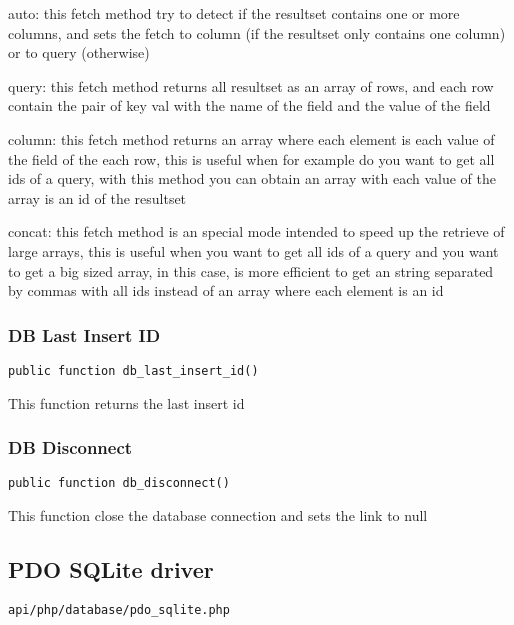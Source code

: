 \documentclass[a4paper]{article}
\begin{document}
auto: this fetch method try to detect if the resultset contains one or more columns, and
sets the fetch to column (if the resultset only contains one column) or to query (otherwise)

query: this fetch method returns all resultset as an array of rows, and each row contain the
pair of key val with the name of the field and the value of the field

column: this fetch method returns an array where each element is each value of the field of
the each row, this is useful when for example do you want to get all ids of a query, with
this method you can obtain an array with each value of the array is an id of the resultset

concat: this fetch method is an special mode intended to speed up the retrieve of large
arrays, this is useful when you want to get all ids of a query and you want to get a big
sized array, in this case, is more efficient to get an string separated by commas with all
ids instead of an array where each element is an id

\hypertarget{toc342}{}
\subsubsection{DB Last Insert ID}

\begin{lstlisting}
public function db_last_insert_id()
\end{lstlisting}

This function returns the last insert id

\hypertarget{toc343}{}
\subsubsection{DB Disconnect}

\begin{lstlisting}
public function db_disconnect()
\end{lstlisting}

This function close the database connection and sets the link to null

\hypertarget{toc344}{}
\subsection{PDO SQLite driver}

\begin{lstlisting}
api/php/database/pdo_sqlite.php
\end{lstlisting}
\end{document}
